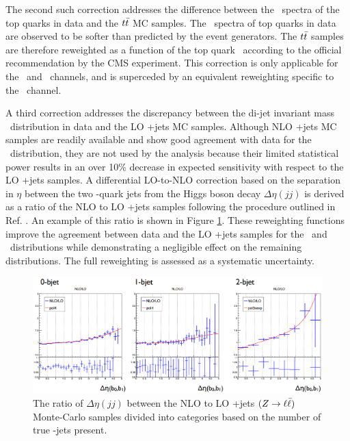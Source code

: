 The second such correction addresses the difference between the \pT\ spectra of the top quarks in data and the $t\bar{t}$ MC samples. The \pT\ spectra of top quarks in data are observed to be softer than predicted by the event generators. The $t\bar{t}$ samples are therefore reweighted as a function of the top quark \pT\ according to the official recommendation by the CMS experiment.\cite{CMSTTCORR} This correction is only applicable for the \ZnnH\ and \ZllH\ channels, and is superceded by an equivalent reweighting specific to the \WlnH\ channel.

A third correction addresses the discrepancy between the di-jet invariant mass \mjj\ distribution in data and the LO \bosV+jets MC samples. Although NLO \bosV+jets MC samples are readily available and show good agreement with data for the \mjj\ distribution, they are not used by the analysis because their limited statistical power results in an over 10\% decrease in expected sensitivity with respect to the LO \bosV+jets samples. A differential LO-to-NLO correction based on the separation in $\eta$ between the two \qrkb-quark jets from the Higgs boson decay $\Delta\eta(jj)$ is derived as a ratio of the NLO to LO \bosV+jets samples following the procedure outlined in Ref. \cite{CMSVHbbEvidence}. An example of this ratio is shown in Figure \ref{fig:NLOtoLOratio}. These reweighting functions improve the agreement between data and the LO \bosV+jets samples for the \mjj\ and \pTV\ distributions while demonstrating a negligible effect on the remaining distributions. The full reweighting is assessed as a systematic uncertainty.

\begin{figure}[htbp]
  \centering
    \includegraphics[width=6in]{images/NLOtoLO}
    \caption[NLO to LO Ratio of $\Delta\eta(jj)$ for \bosZ+jets $(\bosZ \rightarrow \ell\bar{\ell})$ Samples]{The ratio of $\Delta\eta(jj)$ between the NLO to LO \bosZ+jets $(\bosZ \rightarrow \ell\bar{\ell})$ Monte-Carlo samples divided into categories based on the number of true \qrkb-jets present.}
    \label{fig:NLOtoLOratio}
\end{figure}

